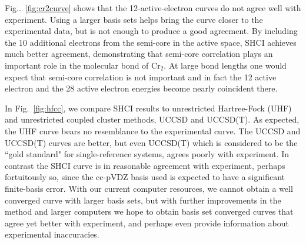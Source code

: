 Fig..~\ref{fig:cr2curve} shows that the 12-active-electron curves do not agree well with experiment.
Using a larger basis sets helps bring the curve closer to the experimental data, but is not enough to produce a good agreement.
By including the 10 additional electrons from the semi-core in the active space, SHCI achieves much better agreement,
demonstrating that semi-core correlation plays an important role in the molecular bond of Cr$_2$.
At large bond lengths one would expect that semi-core correlation is not important and in fact the 12 active electron
and the 28 active electron energies become nearly coincident there.


In Fig.~\ref{fig:hfcc}, we compare SHCI results to unrestricted Hartree-Fock (UHF) and unrestricted coupled cluster methods, UCCSD and UCCSD(T).
As expected, the UHF curve bears no resemblance to the experimental curve.
The UCCSD and UCCSD(T) curves are better, but even UCCSD(T) which is considered to be the ``gold standard" for single-reference
systems, agrees poorly with experiment.  In contrast the SHCI curve is in reasonable agreement with experiment, perhaps
fortuitously so, since the cc-pVDZ basis used is expected to have a significant finite-basis error.
With our current computer resources, we cannot obtain a well converged curve with larger basis sets,
but with further improvements in the method and larger computers we hope to obtain basis set converged curves
that agree yet better with experiment, and perhaps even provide information about experimental inaccuracies.


